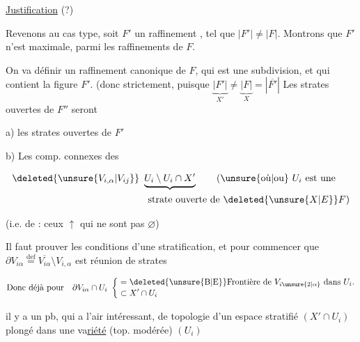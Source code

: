 
\uline{Justification} (?)


Revenons au cas type, soit $F'$ un raffinement , tel que $|F'|\neq|F|$. Montrons que $F'$ n'est  maximale,  parmi les raffinements de $F$.

On va définir un raffinement canonique  de $F$, qui est  une subdivision, et qui contient la figure $F'$. (donc strictement, puisque $\underbrace{|F'|}_{X'}\neq\underbrace{|F|}_{X}=|\overline{F'}|$ Les  strates ouvertes de $F''$ seront

a) les strates ouvertes  de $F'$

b) Les comp. connexes  des

\[
\begin{aligned}
&\deleted{\unsure{V_{i,\alpha}|V_{ij}}}\ \underbrace{U_i\setminus U_i\cap X'}\qquad \text{(\unsure{où|ou} } U_i \text{ est une}\\
&\hspace{14em}\text{strate ouverte de } \deleted{\unsure{X|E}}F\text{)}
\end{aligned}
\]

(i.e. de : ceux $\uparrow$ qui ne sont pas $\varnothing$)

 Il faut prouver les conditions d'une stratification, et pour commencer que $\partial V_{i\alpha}\overset{\mathrm{def}}{=}\overline{V_{i\alpha}}\setminus V_{i,\alpha}$ est réunion de strates

\[
\text{Donc déjà pour}\quad \partial V_{i\alpha}\cap U_i\ \left\{\begin{aligned}&=\text{\deleted{\unsure{B|E}}Frontière de } V_{i\unsure{2|\alpha}}\text{ dans }U_i\text{.}\\[-2pt]&\subset X'\cap U_i\end{aligned}\right.
\]

il y a un pb, qui a l'air intéressant, de topologie d'un espace stratifié $(X'\cap U_i)$ plongé dans une va\uline{riété} (top.  modérée) $(U_i)$

